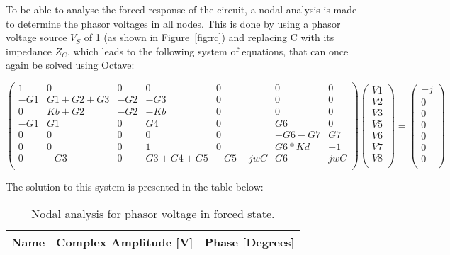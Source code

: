 To be able to analyse the forced response of the circuit, a nodal analysis is made to determine the phasor voltages in all nodes. This is done by using a phasor voltage source $V_S$ of 1 (as shown in Figure~\ref{fig:rc}) and replacing C with its impedance $Z_C$, which leads to the following system of equations, that can once again be solved using Octave:

\begin{equation}
\begin{pmatrix}
1 & 0 & 0 & 0 & 0 & 0 & 0\\
-G1 & G1+G2+G3 & -G2 & -G3 & 0 & 0 & 0\\
0 & Kb+G2 & -G2 & -Kb & 0 & 0 & 0\\
-G1 & G1 & 0 & G4 & 0 & G6 & 0\\
0 & 0 & 0 & 0 & 0 & -G6-G7 & G7\\
0 & 0 & 0 & 1 & 0 & G6*Kd & -1\\
0 & -G3 & 0 & G3+G4+G5 & -G5-jwC & G6 & jwC\\
\end{pmatrix}
\begin{pmatrix}
V1\\
V2\\
V3\\
V5\\
V6\\
V7\\
V8\\
\end{pmatrix}
=
\begin{pmatrix}
-j\\
0\\
0\\
0\\
0\\
0\\
0\\
\end{pmatrix}
\end{equation}


The solution to this system is presented in the table below:


\begin{table}[h]
  \centering
  \begin{tabular}{|l|r|r|}
    \hline    
    {\bf Name} & {\bf Complex Amplitude [V]} & {\bf Phase [Degrees]}\\ \hline
     
  \end{tabular}
  \caption{Nodal analysis for phasor voltage in forced state.}
  \label{tab:phasor}
\end{table}


